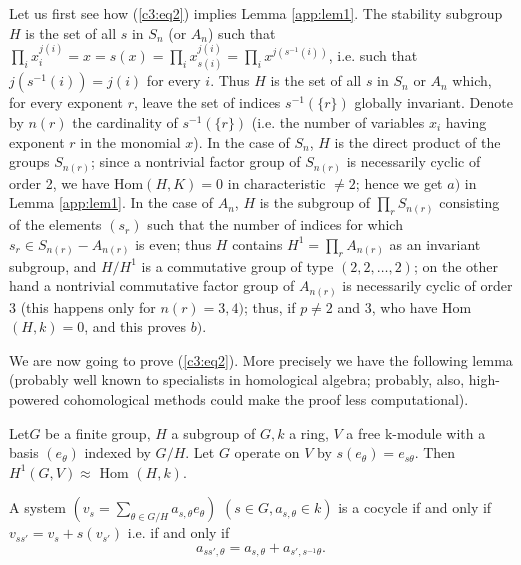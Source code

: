         Let us first see how (\ref{c3:eq2}) implies Lemma
        \ref{app:lem1}. The stability 
        subgroup $H$ is the set of all $s$ in $S_n$ (or $A_n$) such
        that $\prod\limits_i x^{j (i)}_i = x = s(x) = \prod\limits_i
        x^{j (i)}_{s(i)} = \prod\limits_i x^{j (s^{-1} (i))} $,
        i.e. such that $j (s^{-1}(i)) = j (i)$ for  every $i$. Thus $H$
        is the set of all $s$ in $S_n$ or $A_n$ which, for every
        exponent $r$, leave the set of indices $s^{-1} (\{r\})$
        globally invariant. Denote by $n(r)$ the cardinality of $s^{-1}
        (\{r\})$ (i.e. the number of variables $x_i$  having exponent
        $r$ in the monomial $x$). In the case of $S_n$, $H$ is the
        direct product of the groups $S_{n (r)}$; since a nontrivial
        factor group of $S_{n(r)}$ is necessarily cyclic of order 2,
        we have Hom$(H, K)= 0$ in characteristic $\neq 2$; hence we
        get $a)$ in Lemma \ref{app:lem1}. In the case of $A_n$, $H$ is
        the subgroup of $\prod\limits_r S_{n(r)}$ consisting of the
        elements $(s_r)$ such that the number of indices for which
        $s_r \in S_{n(r)} - A_{n(r)}$ is even; thus $H $ contains $H^1
        = \prod\limits_r A_{n(r)}$ as an invariant subgroup, and $H/H^1$
        is a commutative group of type $(2, 2, \ldots , 2)$; on the
        other hand a nontrivial commutative factor group of $A_{n(r)}$
        is necessarily cyclic of order 3 (this  happens only for
        $n(r) = 3, 4)$; thus, if $p \neq 2$ and 3, who have Hom $(H,
        k) = 0$, and this proves $b)$. 
        
        We are now going to prove (\ref{c3:eq2}). More precisely we have the
        following lemma (probably well known to specialists in
        homological algebra; probably, also, high-powered
        cohomological methods could make the proof less
        computational). 
        
        \begin{lem}\label{app:lem2} %
Let\pageoriginale $G$ be a finite group, $H$ a  subgroup of $G, k$ a ring, $V$
  a free k-module with a basis $(e_\theta)$ indexed by $G/H$. Let $G$
  operate on $V$ by $s(e_\theta) = e_{s \theta}$. Then $H^1 (G, V)
  \approx \text{ Hom } (H, k)$. 
        \end{lem}        
        
        A system $(v_s = \sum\limits_{ \theta \in G/ H} a_{s, \theta}
        e _\theta )$ $( s \in G, a_{s, \theta} \in k )$ is a cocycle if
        and only if $v_{ss'} = v_s + s(v_{s'})$ i.e. if and only if  
        \begin{equation*}
a_{ss' , \theta } = a_{s, \theta} + a_{s', s^{-1}\theta}. \tag
{3}\label{c3:eq3} 
        \end{equation*}        
        
